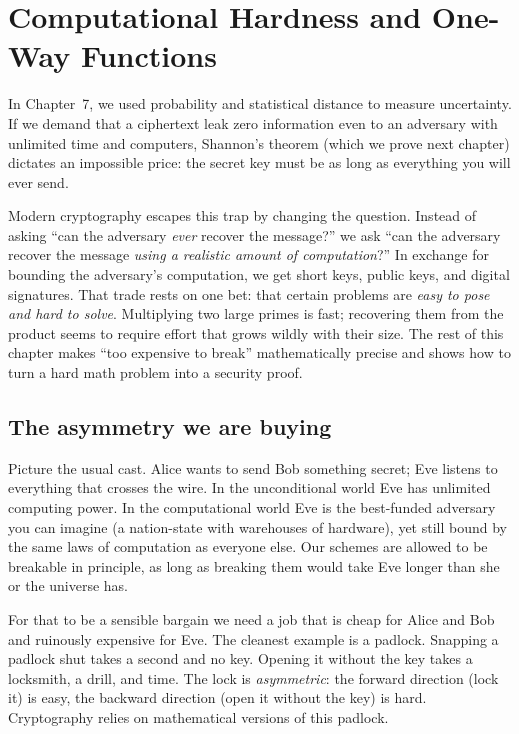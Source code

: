 \chapter{Computational Hardness and One-Way Functions}

In Chapter~7, we used probability and statistical distance to measure uncertainty. If we demand that a ciphertext leak zero information even to an adversary with unlimited time and computers, Shannon's theorem (which we prove next chapter) dictates an impossible price: the secret key must be as long as everything you will ever send.

Modern cryptography escapes this trap by changing the question. Instead of asking ``can the adversary \emph{ever} recover the message?'' we ask ``can the adversary recover the message \emph{using a realistic amount of computation}?'' In exchange for bounding the adversary's computation, we get short keys, public keys, and digital signatures. That trade rests on one bet: that certain problems are \emph{easy to pose and hard to solve}. Multiplying two large primes is fast; recovering them from the product seems to require effort that grows wildly with their size. The rest of this chapter makes ``too expensive to break'' mathematically precise and shows how to turn a hard math problem into a security proof.

\chapterline

\section{The asymmetry we are buying}
\label{ch08:asymmetry}

Picture the usual cast. Alice wants to send Bob something secret; Eve listens to everything that crosses the wire. In the unconditional world Eve has unlimited computing power. In the computational world Eve is the best-funded adversary you can imagine (a nation-state with warehouses of hardware), yet still bound by the same laws of computation as everyone else. Our schemes are allowed to be breakable in principle, as long as breaking them would take Eve longer than she or the universe has.

For that to be a sensible bargain we need a job that is cheap for Alice and Bob and ruinously expensive for Eve. The cleanest example is a padlock. Snapping a padlock shut takes a second and no key. Opening it without the key takes a locksmith, a drill, and time. The lock is \emph{asymmetric}: the forward direction (lock it) is easy, the backward direction (open it without the key) is hard. Cryptography relies on mathematical versions of this padlock.

